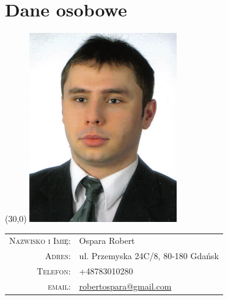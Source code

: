 \documentclass[a4paper,10pt]{article}
\begin{document}
	\par{\bigskip\par}
	
	\section{Dane osobowe}
	\begin{textblock}{1}(30,0)
        \includegraphics[scale=1.0]{me.jpg}
        \end{textblock}
	\begin{tabular}{rl}
		\textsc{Nazwisko i Imię:} & Ospara Robert \\
		\textsc{Adres:} & ul. Przemyska 24C/8, 80-180 Gdańsk \\
		\textsc{Telefon:} & +48783010280 \\
		\textsc{email:} & \href{mailto:robertospara@gmail.com}{robertospara@gmail.com}
	\end{tabular}
		
\end{document}
